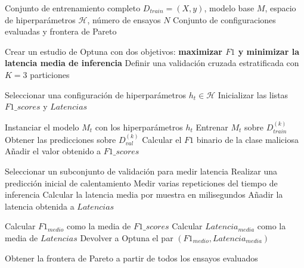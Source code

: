 \begin{algorithm}[H]
\caption{Optimización multiobjetivo con validación cruzada estratificada}
\label{alg:optuna_cv_multiobjetivo}
\begin{algorithmic}[1]
\Require Conjunto de entrenamiento completo $D_{train} = (X, y)$, modelo base $M$, espacio de hiperparámetros $\mathcal{H}$, número de ensayos $N$
\Ensure Conjunto de configuraciones evaluadas y frontera de Pareto

\State Crear un estudio de Optuna con dos objetivos:
\Statex \hspace{\algorithmicindent} \textbf{maximizar $F1$ y minimizar la latencia media de inferencia}
\State Definir una validación cruzada estratificada con $K=3$ particiones

    \State Seleccionar una configuración de hiperparámetros $h_t \in \mathcal{H}$
    \State Inicializar las listas $F1\_scores$ y $Latencias$

        \State Instanciar el modelo $M_t$ con los hiperparámetros $h_t$
        \State Entrenar $M_t$ sobre $D_{train}^{(k)}$
        \State Obtener las predicciones sobre $D_{val}^{(k)}$
        \State Calcular el $F1$ binario de la clase maliciosa
        \State Añadir el valor obtenido a $F1\_scores$

        \State Seleccionar un subconjunto de validación para medir latencia
        \State Realizar una predicción inicial de calentamiento
        \State Medir varias repeticiones del tiempo de inferencia
        \State Calcular la latencia media por muestra en milisegundos
        \State Añadir la latencia obtenida a $Latencias$
    \EndFor

    \State Calcular $F1_{medio}$ como la media de $F1\_scores$
    \State Calcular $Latencia_{media}$ como la media de $Latencias$
    \State Devolver a Optuna el par $(F1_{medio}, Latencia_{media})$
\EndFor

\State Obtener la frontera de Pareto a partir de todos los ensayos evaluados

\end{algorithmic}
\end{algorithm}
